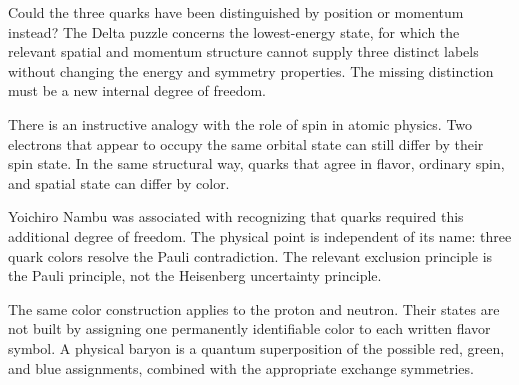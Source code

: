 Could the three quarks have been distinguished by position or momentum instead? The Delta puzzle concerns the lowest-energy state, for which the relevant spatial and momentum structure cannot supply three distinct labels without changing the energy and symmetry properties. The missing distinction must be a new internal degree of freedom.

There is an instructive analogy with the role of spin in atomic physics. Two electrons that appear to occupy the same orbital state can still differ by their spin state. In the same structural way, quarks that agree in flavor, ordinary spin, and spatial state can differ by color.


Yoichiro Nambu was associated with recognizing that quarks required this additional degree of freedom. The physical point is independent of its name: three quark colors resolve the Pauli contradiction. The relevant exclusion principle is the Pauli principle, not the Heisenberg uncertainty principle.


The same color construction applies to the proton and neutron. Their states are not built by assigning one permanently identifiable color to each written flavor symbol. A physical baryon is a quantum superposition of the possible red, green, and blue assignments, combined with the appropriate exchange symmetries.

\begin{classroomqa}
\end{classroomqa}

